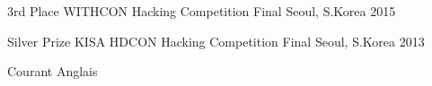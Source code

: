 

\begin{cvhonors}

  \cvhonor
    {3rd Place} %
    {WITHCON Hacking Competition Final} %
    {Seoul, S.Korea} %
    {2015} %

  \cvhonor
    {Silver Prize} %
    {KISA HDCON Hacking Competition Final} %
    {Seoul, S.Korea} %
    {2013} %

\end{cvhonors}



\begin{cvhonors}

  \cvhonor
    {} %
    {Courant} %
    {} %
    {Anglais} %

  

\end{cvhonors}
